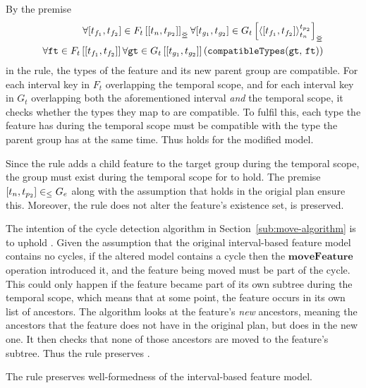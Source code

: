 By the premise
\[
   \begin{split}
      \forall \interval{t_{f_1}}{t_{f_2}} \in \overlapping{F_t}{t_n}{t_{p_2}}
      \forall \interval{t_{g_1}}{t_{g_2}} \in \lookup{G_t}{\clamp{\interval{t_{f_1}}{t_{f_2}}}{t_n}{t_{p_2}}}_{\overlap{}} \\
         \forall \var{ft} \in \lookup{F_t}{\interval{t_{f_1}}{t_{f_2}}}
         \forall \var{gt} \in \lookup{G_t}{\interval{t_{g_1}}{t_{g_2}}}
         \left(\var{compatibleTypes}(\var{gt},\, \var{ft}) \right)
   \end{split}
\]
in the rule, the types of the feature and its new parent group are compatible. For each interval key in $F_t$ overlapping the temporal scope, and for each interval key in $G_t$ overlapping both the aforementioned interval \emph{and} the temporal scope, it checks whether the types they map to are compatible. To fulfil this, each type the feature has during the temporal scope must be compatible with the type the parent group has at the same time. Thus  holds for the modified model.

Since the rule adds a child feature to the target group during the temporal scope, the group must exist during the temporal scope for  to hold. The premise $\interval{t_n}{t_{p_2}} \inn G_e$ along with the assumption that  holds in the origial plan ensure this. Moreover, the rule does not alter the feature's existence set,  is preserved. 

The intention of the cycle detection algorithm in Section~\vref{sub:move-algorithm} is to uphold . Given the assumption that the original interval-based feature model contains no cycles, if the altered model contains a cycle then the $\textbf{moveFeature}$ operation introduced it, and the feature being moved must be part of the cycle. This could only happen if the feature became part of its own subtree during the temporal scope, which means that at some point, the feature occurs in its own list of ancestors. The algorithm looks at the feature's \emph{new} ancestors, meaning the ancestors that the feature does not have in the original plan, but does in the new one. It then checks that none of those ancestors are moved to the feature's subtree. Thus the rule preserves .
\\

\begin{lemma}
   The  rule preserves well-formedness of the interval-based feature model. 
   \label{lemma:move-feature-well-formed}
\end{lemma}

